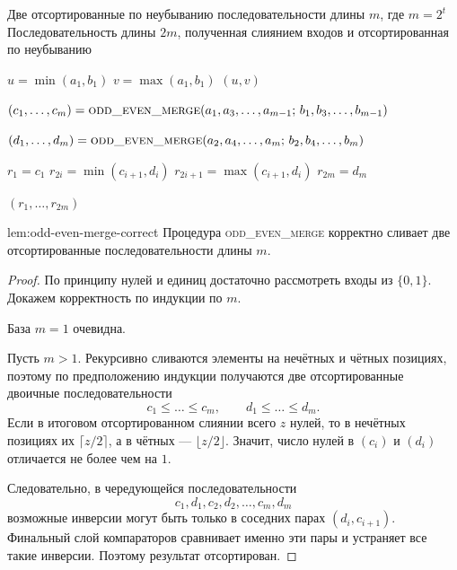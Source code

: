 \begin{algorithm}[H]
	\caption{\textsc{odd\_even\_merge}$(a_1,\dots,a_m;\, b_1,\dots,b_m)$}
	\begin{algorithmic}[1]
		\Require Две отсортированные по неубыванию последовательности длины $m$, где $m=2^t$
		\Ensure Последовательность длины $2m$, полученная слиянием входов и отсортированная по неубыванию
		
		\State $u = \min(a_1,b_1)$
		\State $v = \max(a_1,b_1)$
		\State \Return $(u,v)$
		\EndIf
		
		\State $(c_1,\dots,c_m) = \textsc{odd\_even\_merge}(a_1,a_3,\dots,a_{m-1};\, b_1,b_3,\dots,b_{m-1})$
		
		\State $(d_1,\dots,d_m) = \textsc{odd\_even\_merge}(a_2,a_4,\dots,a_m;\, b_2,b_4,\dots,b_m)$
		
		\State $r_1 = c_1$
		\State $r_{2i} = \min(c_{i+1}, d_i)$
		\State $r_{2i+1} = \max(c_{i+1}, d_i)$
		\EndFor
		\State $r_{2m} = d_m$
		
		\State \Return $(r_1,\dots,r_{2m})$
	\end{algorithmic}
\end{algorithm}

\begin{Lemma}{}{lem:odd-even-merge-correct}
	Процедура \textsc{odd\_even\_merge} корректно сливает две отсортированные последовательности длины $m$.
\end{Lemma}

\begin{proof}
	По принципу нулей и единиц достаточно рассмотреть входы из $\{0,1\}$.
	Докажем корректность по индукции по $m$.
	
	База $m=1$ очевидна.
	
	Пусть $m>1$. Рекурсивно сливаются элементы на нечётных и чётных позициях, поэтому по предположению индукции получаются две отсортированные двоичные последовательности
	\[
	c_1\le \dots \le c_m,
	\qquad
	d_1\le \dots \le d_m.
	\]
	Если в итоговом отсортированном слиянии всего $z$ нулей, то в нечётных позициях их $\lceil z/2\rceil$, а в чётных --- $\lfloor z/2\rfloor$.
	Значит, число нулей в $(c_i)$ и $(d_i)$ отличается не более чем на $1$.
	
	Следовательно, в чередующейся последовательности
	\[
	c_1,d_1,c_2,d_2,\dots,c_m,d_m
	\]
	возможные инверсии могут быть только в соседних парах $(d_i,c_{i+1})$.
	Финальный слой компараторов сравнивает именно эти пары и устраняет все такие инверсии.
	Поэтому результат отсортирован.
\end{proof}


